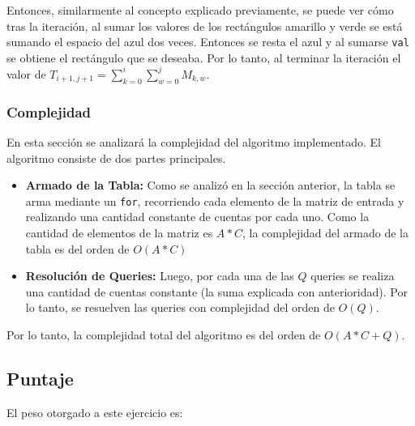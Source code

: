 Entonces, similarmente al concepto explicado previamente, se puede ver cómo tras la iteración, al sumar los valores de los rectángulos amarillo y verde se está sumando el espacio del azul dos veces. Entonces se resta el azul y al sumarse \texttt{val} se obtiene el rectángulo que se deseaba. Por lo tanto, al terminar la iteración el valor de $T_{i+1,j+1} = \sum_{k=0}^{i} \sum_{w=0}^{j} M_{k,w}$. 

\subsubsection{Complejidad}

En esta sección se analizará la complejidad del algoritmo implementado. El algoritmo consiste de dos partes principales.

\begin{itemize}
    \item \textbf{Armado de la Tabla:} Como se analizó en la sección anterior, la tabla se arma mediante un \texttt{for}, recorriendo cada elemento de la matriz de entrada y realizando una cantidad constante de cuentas por cada uno. Como la cantidad de elementos de la matriz es $A*C$, la complejidad del armado de la tabla es del orden de $O(A*C)$
    \item \textbf{Resolución de Queries:} Luego, por cada una de las $Q$ queries se realiza una cantidad de cuentas constante (la suma explicada con anterioridad). Por lo tanto, se resuelven las queries con complejidad del orden de $O(Q)$.
\end{itemize}

Por lo tanto, la complejidad total del algoritmo es del orden de $O(A*C + Q)$.

\subsection{Puntaje}
El peso otorgado a este ejercicio es:

